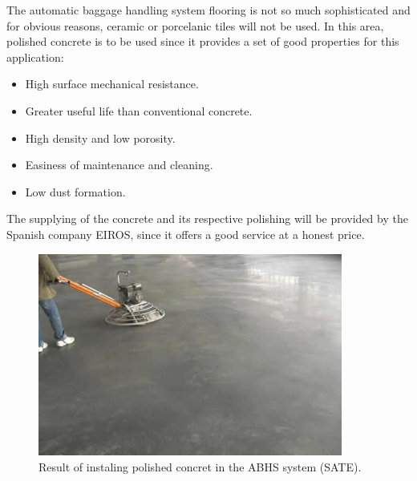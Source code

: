 	The automatic baggage handling system flooring is not so much sophisticated and for obvious reasons, ceramic or porcelanic tiles will not be used. In this area, polished concrete is to be used since it provides a set of good properties for this application:
	\begin{itemize}
	\item High surface mechanical resistance.
	\item Greater useful life than conventional concrete.
	\item High density and low porosity.
	\item Easiness of maintenance and cleaning.
	\item Low dust formation.
	\end{itemize}
The supplying of the concrete and its respective polishing will be provided by the Spanish company EIROS, since it offers a good service at a honest price.

\begin{figure}[ht!]
	\centering
\includegraphics[width=10cm]{./images/Resultado5}
\caption{Result of instaling polished concret in the ABHS system (SATE).}
\end{figure}

		